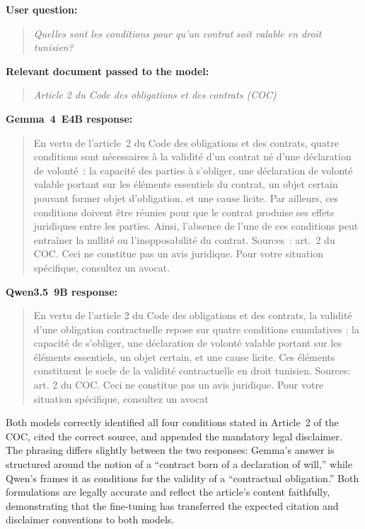 \vspace{0.5em}

\noindent\textbf{User question:}

\begin{quote}
\textit{Quelles sont les conditions pour qu'un contrat soit valable en droit tunisien?}
\end{quote}

\noindent\textbf{Relevant document passed to the model:}

\begin{quote}
\textit{Article 2 du Code des obligations et des contrats (COC)}
\end{quote}

\vspace{0.5em}

\noindent\textbf{Gemma~4~E4B response:}

\begin{quote}
En vertu de l'article~2 du Code des obligations et des contrats, quatre conditions sont
nécessaires à la validité d'un contrat né d'une déclaration de volonté~: la capacité des
parties à s'obliger, une déclaration de volonté valable portant sur les éléments essentiels
du contrat, un objet certain pouvant former objet d'obligation, et une cause licite.
Par ailleurs, ces conditions doivent être réunies pour que le contrat produise ses effets
juridiques entre les parties. Ainsi, l'absence de l'une de ces conditions peut entraîner
la nullité ou l'inopposabilité du contrat.
Sources~: art.~2 du COC. Ceci ne constitue pas un avis juridique. Pour votre situation
spécifique, consultez un avocat.

\end{quote}

\noindent\textbf{Qwen3.5~9B response:}

\begin{quote}
En vertu de l'article 2 du Code des obligations et des contrats, la validité d'une obligation contractuelle repose sur quatre conditions cumulatives : la capacité de s'obliger, une déclaration de volonté valable portant sur les éléments essentiels, un objet certain, et une cause licite. Ces éléments constituent le socle de la validité contractuelle en droit tunisien. Sources: art. 2 du COC. Ceci ne constitue pas un avis juridique. Pour votre situation spécifique, consultez un avocat
\end{quote}

Both models correctly identified all four conditions stated in Article~2 of the COC, cited the correct source, and appended the mandatory legal disclaimer. The phrasing differs slightly between the two responses: Gemma's answer is structured around the notion of a ``contract born of a declaration of will,'' while Qwen's frames it as conditions for the validity of a ``contractual obligation.'' Both formulations are legally accurate and reflect the article's content faithfully, demonstrating that the fine-tuning has transferred the expected citation and disclaimer conventions to both models.

